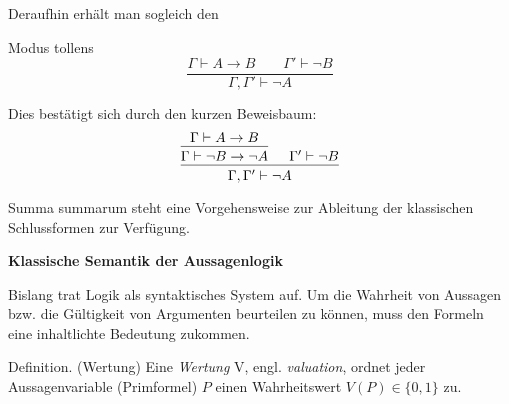 \documentclass[8pt]{beamer}
\newcommand{\strong}[1]{\textsf{\textbf{#1}}}
\newcommand{\centerheadline}[1]{%
  \begin{center}\strong{#1}\end{center}}
\newcommand{\cond}{\rightarrow}
\begin{document}
\begin{frame}
Deraufhin erhält man sogleich den

\begin{block}{Modus tollens}
\[\dfrac{\Gamma\vdash A\to B\qquad\Gamma'\vdash\lnot B}{\Gamma,\Gamma'\vdash\lnot A}\]
\end{block}

Dies bestätigt sich durch den kurzen Beweisbaum:
\[\begin{prooftree}
    \hypo{\Gamma\vdash A\cond B}
  \infer1{\Gamma\vdash\lnot B\cond\lnot A}
  \hypo{\Gamma'\vdash\lnot B}
\infer2{\Gamma,\Gamma'\vdash\lnot A}
\end{prooftree}\]

Summa summarum steht eine Vorgehensweise zur Ableitung der klassischen
Schlussformen zur Verfügung.
\end{frame}

\begin{frame}
\centerheadline{Klassische Semantik der Aussagenlogik}
\end{frame}

\begin{frame}
Bislang trat Logik als syntaktisches System auf. Um die Wahrheit
von Aussagen bzw. die Gültigkeit von Argumenten beurteilen zu können,
muss den Formeln eine inhaltlichte Bedeutung zukommen.\pause

\begin{block}{Definition. (Wertung)}
Eine \emph{Wertung} V, engl. \emph{valuation}, ordnet jeder
Aussagenvariable (Primformel) $P$ einen Wahrheitswert $V(P)\in\{0,1\}$ zu.
\end{block}
\end{frame}
\end{document}
